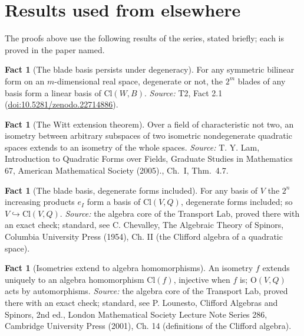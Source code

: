 \documentclass[11pt]{article}
\theoremstyle{definition}
\newtheorem{fact}[theorem]{Fact}
\theoremstyle{plain}
\providecommand{\Cl}{}\renewcommand{\Cl}{\mathrm{Cl}}
\begin{document}
\section{Results used from elsewhere}
The proofs above use the following results of the series, stated briefly; each is proved in the paper named.

\begin{fact}[The blade basis persists under degeneracy]\label{c:conformal.blade-basis-persists-under-degeneracy}
For any symmetric bilinear form on an $m$-dimensional real space, degenerate or not, the $2^m$ blades of any basis form a linear basis of $\Cl(W,B)$.
\emph{Source:} T2, Fact 2.1 (\href{https://doi.org/10.5281/zenodo.22714886}{doi:10.5281/zenodo.22714886}).
\end{fact}

\begin{fact}[The Witt extension theorem]\label{c:conformal.witt-extension-theorem}
Over a field of characteristic not two, an isometry between arbitrary subspaces of two isometric nondegenerate quadratic spaces extends to an isometry of the whole spaces.
\emph{Source:} T. Y. Lam, Introduction to Quadratic Forms over Fields, Graduate Studies in Mathematics 67, American Mathematical Society (2005)., Ch.~I, Thm.~4.7.
\end{fact}

\begin{fact}[The blade basis, degenerate forms included]\label{c:std-algebra.blade-basis}
For any basis of $V$ the $2^{n}$ increasing products $e_I$ form a basis of $\Cl(V, Q)$, degenerate forms included; so $V \hookrightarrow \Cl(V, Q)$.
\emph{Source:} the algebra core of the Transport Lab, proved there with an exact check; standard, see C. Chevalley, The Algebraic Theory of Spinors, Columbia University Press (1954), Ch. II (the Clifford algebra of a quadratic space).
\end{fact}

\begin{fact}[Isometries extend to algebra homomorphisms]\label{c:std-algebra.functoriality}
An isometry $f$ extends uniquely to an algebra homomorphism $\Cl(f)$, injective when $f$ is; $\mathrm{O}(V, Q)$ acts by automorphisms.
\emph{Source:} the algebra core of the Transport Lab, proved there with an exact check; standard, see P. Lounesto, Clifford Algebras and Spinors, 2nd ed., London Mathematical Society Lecture Note Series 286, Cambridge University Press (2001), Ch. 14 (definitions of the Clifford algebra).
\end{fact}
\end{document}
